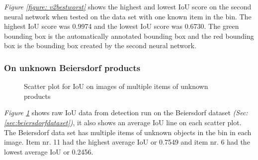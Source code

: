 \textit{Figure \ref{figure: v2bestworst}} shows the highest and lowest IoU score on the second neural network when tested on the data set with one known item in the bin. The highest IoU score was 0.9974 and the lowest IoU score was 0.6730. The green bounding box is the automatically annotated bounding box and the red bounding box is the bounding box created by the second neural network.

\clearpage
\subsubsection{On unknown Beiersdorf products}\label{subsec:v2resunknownprod}

\begin{figure}[h]
    \centering
    \hfill
    \caption{Scatter plot for IoU on images of multiple items of unknown products}
    \label{figure: v2unknownproducts}
\end{figure}

\textit{Figure \ref{figure: v2unknownproducts}} shows raw IoU data from detection run on the Beiersdorf dataset \textit{(Sec: \ref{sec:beiersdorfdataset})}, it also shows an average IoU line on each scatter plot. The Beiersdorf data set has multiple items of unknown objects in the bin in each image.
Item nr. 11 had the highest average IoU or 0.7549 and item nr. 6 had the lowest average IoU or 0.2456. 

